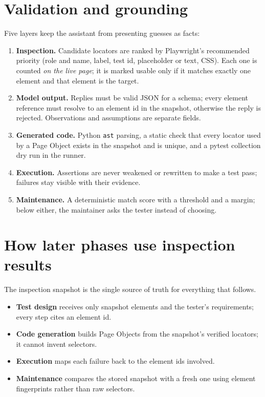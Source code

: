 \documentclass[11pt,a4paper]{article}
\newcommand{\code}[1]{\texttt{#1}}
\begin{document}
\section{Validation and grounding}
\label{sec:validation}
Five layers keep the assistant from presenting guesses as facts:
\begin{enumerate}
  \item \textbf{Inspection.} Candidate locators are ranked by Playwright's recommended priority (role and name, label, test id, placeholder or text, CSS). Each one is counted \emph{on the live page}; it is marked usable only if it matches exactly one element and that element is the target.
  \item \textbf{Model output.} Replies must be valid JSON for a schema; every element reference must resolve to an element id in the snapshot, otherwise the reply is rejected. Observations and assumptions are separate fields.
  \item \textbf{Generated code.} Python \code{ast} parsing, a static check that every locator used by a Page Object exists in the snapshot and is unique, and a pytest collection dry run in the runner.
  \item \textbf{Execution.} Assertions are never weakened or rewritten to make a test pass; failures stay visible with their evidence.
  \item \textbf{Maintenance.} A deterministic match score with a threshold and a margin; below either, the maintainer asks the tester instead of choosing.
\end{enumerate}

\section{How later phases use inspection results}
\label{sec:later}
The inspection snapshot is the single source of truth for everything that follows.
\begin{itemize}
  \item \textbf{Test design} receives only snapshot elements and the tester's requirements; every step cites an element id.
  \item \textbf{Code generation} builds Page Objects from the snapshot's verified locators; it cannot invent selectors.
  \item \textbf{Execution} maps each failure back to the element ids involved.
  \item \textbf{Maintenance} compares the stored snapshot with a fresh one using element fingerprints rather than raw selectors.
\end{itemize}
\end{document}
